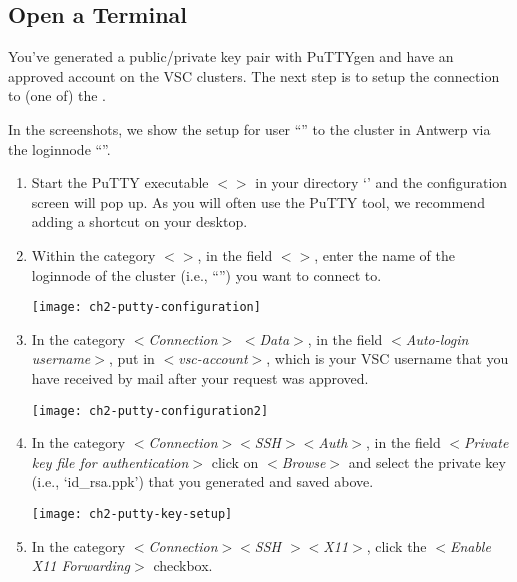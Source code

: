   \subsection{Open a Terminal}
  \label{sec:windows-open-a-terminal}

  You've generated a public/private key pair with PuTTYgen and have an approved
  account on the VSC clusters.  The next step is to setup the connection to (one
  of) the \hpc.

  In the screenshots, we show the setup for user ``''
  to the \hpc cluster in Antwerp via the loginnode
  ``\strong{\emph{\loginnode}}''.

  \begin{enumerate}
    \item  Start the PuTTY executable $<$$>$ in your
      directory `' and the
      configuration screen will pop up. As you will often use the PuTTY tool,
      we recommend adding a shortcut on your desktop.
    \item  Within the category $<$$>$, in the field
      $<$$>$, enter the name of the loginnode of the
      \hpc cluster (i.e., ``\strong{\emph{\loginnode}}'')
      you want to connect to.

    \texttt{[image: ch2-putty-configuration]}

    \item  In the category $<$\emph{Connection}$>$ $<$\emph{Data}$>$, in
      the field $<$\emph{Auto-login username}$>$, put in
      $<$\emph{vsc-account}$>$, which is your VSC username that you have
      received by mail after your request was approved.

  \texttt{[image: ch2-putty-configuration2]}

    \item  In the category $<$\emph{Connection$>$$<$SSH$>$$<$Auth$>$}, in the
      field $<$\emph{Private key file for authentication}$>$ click on
      $<$\emph{Browse}$>$ and select the private key (i.e., `id\_rsa.ppk')
      that you generated and saved above.

  \texttt{[image: ch2-putty-key-setup]}

    \item  In the category $<$\emph{Connection$>$$<$SSH $>$$<$X11$>$}, click
      the $<$\emph{Enable X11 Forwarding}$>$ checkbox.


\end{enumerate}
